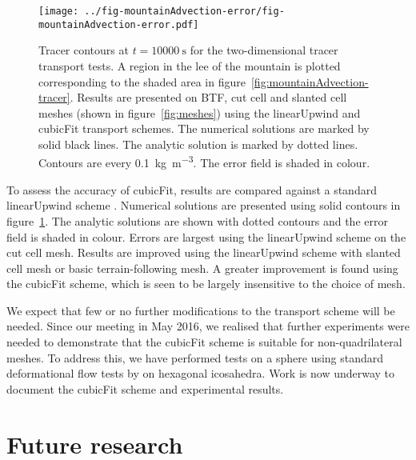\documentclass[a4paper,11pt]{article}
\begin{document}
\begin{figure}
	\centering
	\texttt{[image: ../fig-mountainAdvection-error/fig-mountainAdvection-error.pdf]}
	\caption{Tracer contours at $t=\SI{10000}{\second}$ for the two-dimensional tracer transport tests.  A region in the lee of the mountain is plotted corresponding to the shaded area in figure~\ref{fig:mountainAdvection-tracer}.  Results are presented on BTF, cut cell and slanted cell meshes (shown in figure~\ref{fig:meshes}) using the linearUpwind and cubicFit transport schemes.  The numerical solutions are marked by solid black lines.  The analytic solution is marked by dotted lines.  Contours are every \SI{0.1}{\kilo\gram\per\meter\cubed}.  The error field is shaded in colour.}
	\label{fig:mountainAdvection-errors}
\end{figure}

To assess the accuracy of cubicFit, results are compared against a standard linearUpwind scheme .  Numerical solutions are presented using solid contours in figure~\ref{fig:mountainAdvection-errors}.  The analytic solutions are shown with dotted contours and the error field is shaded in colour.
Errors are largest using the linearUpwind scheme on the cut cell mesh.  Results are improved using the linearUpwind scheme with slanted cell mesh or basic terrain-following mesh.  A greater improvement is found using the cubicFit scheme, which is seen to be largely insensitive to the choice of mesh.

We expect that few or no further modifications to the transport scheme will be needed.   Since our meeting in May 2016, we realised that further experiments were needed to demonstrate that the cubicFit scheme is suitable for non-quadrilateral meshes.  To address this, we have performed tests on a sphere using standard deformational flow tests by \citet{lauritzen2012} on hexagonal icosahedra.
Work is now underway to document the cubicFit scheme and experimental results.

\section{Future research}
\label{sec:future}
\end{document}
